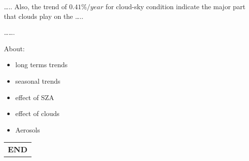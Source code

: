 \documentclass[preprint, 3p,
authoryear]{elsarticle} %
\begin{document}
\ldots.. Also, the trend of \(0.41\%/year\) for cloud-sky condition
indicate the major part that clouds play on the \ldots..

\ldots\ldots.

About:

\begin{itemize}
\item
  long terms trends
\item
  seasonal trends
\item
  effect of SZA
\item
  effect of clouds
\item
  Aerosols
\end{itemize}

\begin{longtable}[]{@{}c@{}}
\toprule\noalign{}
\endhead
\bottomrule\noalign{}
\endlastfoot
\textbf{END} \\
\end{longtable}


\end{document}
